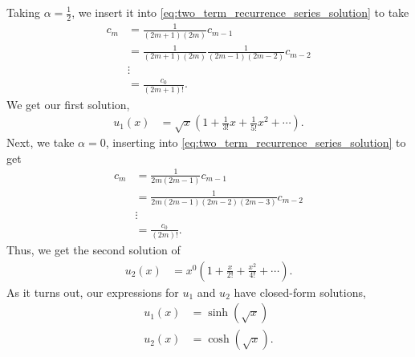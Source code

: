 \documentclass[10pt]{mypackage}
\begin{document}
\begin{example}
    Taking $\alpha = \frac{1}{2}$, we insert it into \eqref{eq:two_term_recurrence_series_solution} to take
    \begin{align*}
      c_m &= \frac{1}{\left( 2m + 1 \right)\left( 2m \right)} c_{m-1}\\
          &= \frac{1}{\left( 2m+1 \right)\left( 2m \right)} \frac{1}{\left( 2m-1 \right)\left( 2m-2 \right)}c_{m-2}\\
          &\vdots\\
          &= \frac{c_0}{\left( 2m + 1 \right)!}.
    \end{align*}
    We get our first solution,
    \begin{align*}
      u_1(x) &= \sqrt{x}\left( 1 + \frac{1}{3!}x + \frac{1}{5!}x^2 + \cdots \right).
    \end{align*}
    Next, we take $\alpha = 0$, inserting into \eqref{eq:two_term_recurrence_series_solution} to get
    \begin{align*}
      c_m &= \frac{1}{2m\left( 2m-1 \right)}c_{m-1}\\
          &= \frac{1}{2m\left( 2m-1 \right)\left( 2m-2 \right)\left( 2m-3 \right)}c_{m-2}\\
          &\vdots\\
          &= \frac{c_0}{\left( 2m \right)!}.
    \end{align*}
    Thus, we get the second solution of
    \begin{align*}
      u_2(x) &= x^{0}\left( 1 + \frac{x}{2!} + \frac{x^2}{4!} + \cdots \right).
    \end{align*}
    As it turns out, our expressions for $u_1$ and $u_2$ have closed-form solutions,
    \begin{align*}
      u_1(x) &= \sinh\left( \sqrt{x} \right)\\
      u_2\left( x \right) &= \cosh\left( \sqrt{x} \right).
    \end{align*}
  \end{example}
\end{document}
